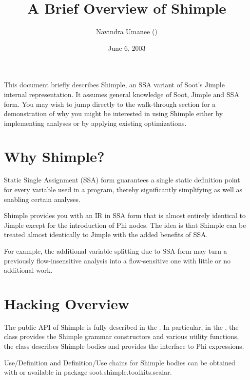 \documentclass[10pt,letterpaper,oneside,onecolumn]{article}
\title{A Brief Overview of Shimple}
\author{Navindra Umanee
(\htmladdnormallink{navindra@cs.mcgill.ca}{mailto:navindra@cs.mcgill.ca})}
\date{June 6, 2003}
\begin{document}
\maketitle

This document briefly describes Shimple, an SSA variant of Soot's
Jimple internal representation.  It assumes general knowledge of Soot,
Jimple and SSA form. You may wish to jump directly to the walk-through
section for a demonstration of why you might be interested in using
Shimple either by implementing analyses or by applying existing
optimizations.

\section{Why Shimple?}

Static Single Assignment (SSA) form guarantees a single static
definition point for every variable used in a program, thereby
significantly simplifying as well as enabling certain analyses.

Shimple provides you with an IR in SSA form that is almost entirely
identical to Jimple except for the introduction of Phi nodes.  The
idea is that Shimple can be treated almost identically to Jimple with
the added benefits of SSA.  

For example, the additional variable splitting due to SSA form may
turn a previously flow-insensitive analysis into a flow-sensitive one
with little or no additional work.

\section{Hacking Overview}

The public API of Shimple is fully described in the
.  In particular,
in the ,
the
class provides the Shimple grammar constructors and various utility
functions, the
class describes Shimple bodies and
provides the interface to Phi expressions.

Use/Definition and Definition/Use chains for Shimple bodies can be
obtained with
or
available in package soot.shimple.toolkits.scalar.
\end{document}
